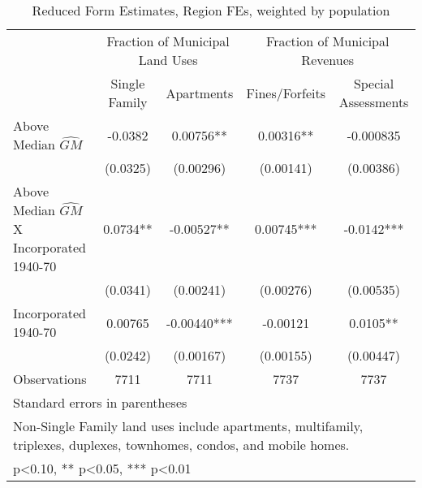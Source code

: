 \begin{table}[htbp]\centering
\def\sym#1{\ifmmode^{#1}\else\(^{#1}\)\fi}
\caption{Reduced Form Estimates, Region FEs, weighted by population}
\begin{tabular}{l*{4}{c}}
\toprule
                    &\multicolumn{2}{c}{Fraction of Municipal Land Uses}&\multicolumn{2}{c}{Fraction of Municipal Revenues}\\\cmidrule(lr){2-3}\cmidrule(lr){4-5}
                    &\multicolumn{1}{c}{Single Family}&\multicolumn{1}{c}{Apartments}&\multicolumn{1}{c}{Fines/Forfeits}&\multicolumn{1}{c}{Special Assessments}\\
\midrule
Above Median $\widehat{GM}$&     -0.0382   &     0.00756** &     0.00316** &   -0.000835   \\
                    &    (0.0325)   &   (0.00296)   &   (0.00141)   &   (0.00386)   \\
\addlinespace
Above Median $\widehat{GM}$ X Incorporated 1940-70&      0.0734** &    -0.00527** &     0.00745***&     -0.0142***\\
                    &    (0.0341)   &   (0.00241)   &   (0.00276)   &   (0.00535)   \\
\addlinespace
Incorporated 1940-70&     0.00765   &    -0.00440***&    -0.00121   &      0.0105** \\
                    &    (0.0242)   &   (0.00167)   &   (0.00155)   &   (0.00447)   \\
\midrule
Observations        &        7711   &        7711   &        7737   &        7737   \\
\bottomrule
\multicolumn{5}{l}{\footnotesize Standard errors in parentheses}\\
\multicolumn{5}{l}{\footnotesize Non-Single Family land uses include apartments, multifamily, triplexes, duplexes, townhomes, condos, and mobile homes.}\\
\multicolumn{5}{l}{\footnotesize * p<0.10, ** p<0.05, *** p<0.01}\\
\end{tabular}
\end{table}
